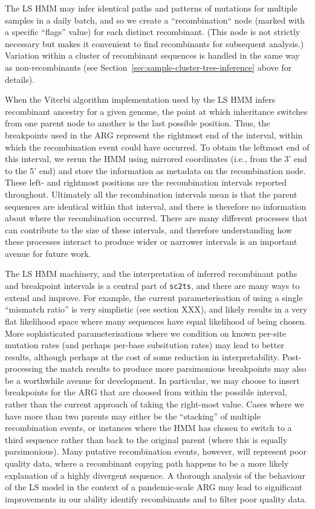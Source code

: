 \documentclass{article}
\begin{document}
The LS HMM may infer identical paths and patterns of mutations
for multiple samples in a daily batch, and so we
create a ``recombination`` node (marked with a specific ``flags'' value)
for each distinct recombinant. (This node is not strictly necessary
but makes it convenient to find recombinants for subsequent analysis.)
Variation within a cluster
of recombinant sequences is handled in the same way as non-recombinants
(see Section~\ref{sec:sample-cluster-tree-inference} above for details).

When the Viterbi algorithm implementation used by the LS HMM infers
recombinant ancestry for a given genome, the point at which inheritance
switches from one parent node to another is the last possible
position.
Thus, the breakpoints used in the ARG represent the rightmost end of the
interval, within which the recombination event could have occurred. To obtain
the leftmost end of this interval, we rerun the HMM using mirrored coordinates
(i.e., from the 3’ end to the 5’ end) and store the information as
metadata on the recombination node.
These left- and rightmost positions
are the recombination intervals reported throughout.
Ultimately all the recombination intervals mean is that the parent sequences
are identical within that interval, and there is therefore no information
about where the recombination occurred. There are many different processes
that can contribute to the size of these intervals, and therefore
understanding how these processes interact to produce wider or narrower
intervals is an important avenue for future work.

The LS HMM machinery, and the interpretation of inferred recombinant paths and
breakpoint intervals is a central part of \texttt{sc2ts}, and there are many
ways to extend and improve. For example, the current parameterisation of using
a single ``mismatch ratio'' is very simplistic (see section XXX), and likely
results in a very flat likelihood space where many sequences have equal
likelihood of being chosen. More sophisticated parameterisations where we
condition on known per-site mutation rates (and perhaps per-base subsitution
rates) may lead to better results, although perhaps at the cost of some
reduction in interpretability. Post-processing the match results to produce
more parsimonious breakpoints may also be a worthwhile avenue for development.
In particular, we may choose to insert breakpoints for the ARG that are choosed
from within the possible interval, rather than the current approach of taking
the right-most value. Cases where we have more than two parents may either be
the ``stacking'' of multiple recombination events, or instances where
the HMM has chosen to switch to a third sequence rather than back to
the original parent (where this is equally parsimonious). Many putative
recombination events, however, will represent poor quality data, where
a recombinant copying path happens to be a more likely explanation
of a highly divergent sequence.
A thorough analysis of the behaviour of the LS model in the context
of a pandemic-scale ARG may lead to significant improvements in our
ability identify recombinants and to filter poor quality data.
\end{document}
